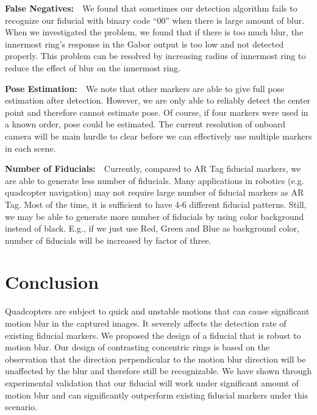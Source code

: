 \documentclass[runningheads]{llncs}
\begin{document}
\noindent\textbf{False Negatives:}~~We found that sometimes our detection
algorithm fails to recognize our fiducial with binary code ``00'' when there is
large amount of blur.  When we
investigated the problem, we found that if there is too much blur, the innermost
ring's response in the Gabor output is too low and not detected properly.  
This problem can be resolved by increasing radius of innermost ring to 
reduce the effect of blur on the innermost ring.  

\noindent\textbf{Pose Estimation:}~~We note that other markers are able to give
full pose estimation after detection.  However, we are only able to reliably detect
the center point and therefore cannot estimate pose.  Of course, if four
markers were used in a known order, pose could be estimated. The current
resolution of onboard camera will be main hurdle to clear before we can
effectively use multiple markers in each scene.

\noindent\textbf{Number of Fiducials:}~~Currently, compared to AR Tag fiducial
markers, we are able to generate less number of fiducials. Many applications in
robotics (e.g. quadcopter navigation) may not require large number of fiducial
markers as AR Tag. Most of the time, it is sufficient to have 4-6
different fiducial patterns. Still, we may be able to generate more number of
fiducials by using color background instead of black. E.g., if we just use Red,
Green and Blue as background color, number of fiducials will be increased by
factor of three.

\section{Conclusion}

Quadcopters are subject to quick and unstable motions that can cause significant
motion blur in the captured images. It severely affects the detection rate of
existing fiducial markers. We proposed the design of a fiducial that is robust
to motion blur. Our design of contrasting concentric rings is based on the 
observation that the direction perpendicular to the motion blur direction will
be unaffected by the blur and therefore still be recognizable. We have shown
through experimental validation that our fiducial will work under significant
amount of motion blur and can significantly outperform existing fiducial
markers under this scenario.



\end{document}
